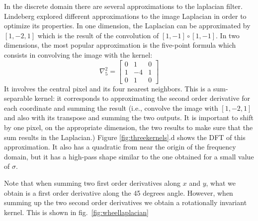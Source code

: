 In the discrete domain there are several approximations to the laplacian filter. Lindeberg \cite{} explored different approximations to the image Laplacian in order to optimize its properties. In one dimension, the Laplacian can be approximated by $\left[ 1,-2,1 \right]$ which is the result of the convolution of $\left[1,-1 \right] \circ \left[1,-1 \right]$.
In two dimensions, the most popular approximation is the five-point formula which consists in convolving the image with the kernel:
\begin{equation}
	\nabla_5^2 =
	\begin{bmatrix}
		0 & 1  & 0 \\
		1 & -4 & 1 \\
		0 & 1  & 0
	\end{bmatrix}
\end{equation}
It involves the central pixel and its four nearest neighbors. This is a sum-separable kernel: it corresponds to approximating the second order derivative for each coordinate and summing the result (i.e., convolve the image with $\left[1,-2,1\right]$ and also with its transpose and summing the two outputs. It is important to shift by one pixel, on the appropriate dimension, the two results to make sure that the sum results in the Laplacian.) Figure \ref{fig:threekernels}.d shows the DFT of this approximation. It also has a quadratic from near the origin of the frequency domain, but it has a high-pass shape similar to the one obtained for a small value of $\sigma$.

Note that when summing two first order derivatives along $x$ and $y$, what we obtain is a first order derivative along the 45 degrees angle. However, when summing up the two second order derivatives we obtain a rotationally invariant kernel. This is shown in fig.~\ref{fig:wheellaplacian}


